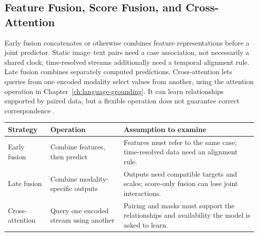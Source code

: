 \subsection{Feature Fusion, Score Fusion, and Cross-Attention}

Early fusion concatenates or otherwise combines feature representations before a joint predictor. Static image--text pairs need a case association, not necessarily a shared clock; time-resolved streams additionally need a temporal alignment rule. Late fusion combines separately computed predictions. Cross-attention lets queries from one encoded modality select values from another, using the attention operation in Chapter~\ref{ch:language-grounding}. It can learn relationships supported by paired data, but a flexible operation does not guarantee correct correspondence \citep{baltrusaitis2019}.

\par\addvspace{\intextsep}\noindent\begin{minipage}{\linewidth}
\centering
\setlength{\tabcolsep}{3pt}
\renewcommand{\arraystretch}{1.12}
\begin{tabular}{@{}>{\raggedright\arraybackslash}p{2.35cm}>{\raggedright\arraybackslash}p{3.3cm}>{\raggedright\arraybackslash}p{4.35cm}@{}}
\toprule
Strategy & Operation & Assumption to examine \\
\midrule
Early fusion & Combine features, then predict & Features must refer to the same case; time-resolved data need an alignment rule. \\
Late fusion & Combine modality-specific outputs & Outputs need compatible targets and scales; score-only fusion can lose joint interactions. \\
Cross-attention & Query one encoded stream using another & Pairing and masks must support the relationships and availability the model is asked to learn. \\
\bottomrule
\end{tabular}
\label{tab:fusion-strategies}
\end{minipage}\par\addvspace{\intextsep}

